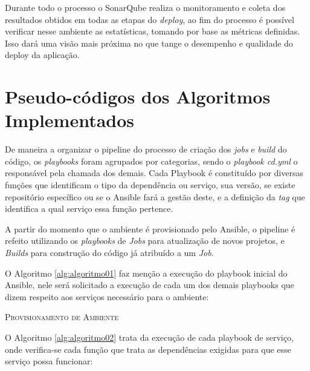 Durante todo o processo o SonarQube realiza o monitoramento e coleta dos resultados obtidos em todas as etapas do \textit{deploy}, ao fim do processo é possível verificar nesse ambiente as estatísticas, tomando por base as métricas definidas. Isso dará uma visão mais próxima no que tange o desempenho e qualidade do deploy da aplicação.

\section{Pseudo-códigos dos Algoritmos Implementados}

De maneira a organizar o pipeline do processo de criação dos \textit{jobs }e \textit{build} do código, os \textit{playbooks} foram agrupados por categorias, sendo o \textit{playbook cd.yml} o responsável pela chamada dos demais. Cada Playbook é constituído por diversas funções que identificam o tipo da dependência ou serviço, sua versão, se existe repositório específico ou se o Ansible fará a gestão deste, e a definição da \textit{tag} que identifica a qual serviço essa função pertence.

A partir do momento que o ambiente é provisionado pelo Ansible, o pipeline é refeito utilizando os \textit{playbooks} de \textit{Jobs} para atualização de novos projetos, e \textit{Builds} para construção do código já atribuído a um \textit{Job}.

    \vspace*{2cm}
O Algoritmo \ref{alg:algoritmo01} faz menção a execução do playbook inicial do Ansible, nele será solicitado a execução de cada um dos demais playbooks que dizem respeito aos serviços necessário para o ambiente:

\begin{algorithm}[H]
	\SetAlgoLined

	\caption{\textsc{Provisionamento de Ambiente}}
		\label{alg:algoritmo01}
\end{algorithm}
\newpage 
O Algoritmo \ref{alg:algoritmo02} trata da execução de cada playbook de serviço, onde verifica-se cada função que trata as dependências exigidas para que esse serviço possa funcionar:

